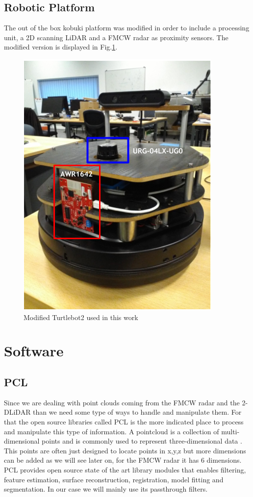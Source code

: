 \subsection{Robotic Platform}
The out of the box kobuki platform was modified in order to include a processing unit, a 2D scanning \ac{LiDAR} and a \ac{FMCW} radar as proximity sensors. The modified version is displayed in Fig.\ref{fig::turlebot2M}. 

\begin{figure}[h] 
\centerline{\includegraphics [width=0.5 \textwidth]{imgs/chapter4/turtlebot2.PNG}}
\caption{Modified Turtlebot2 used in this work}
\label{fig::turlebot2M}
\end{figure}


\section{Software}

\subsection{\ac{PCL}}

Since we are dealing with point clouds coming from the \ac{FMCW} \ac{radar} and the 2-D\ac{LiDAR} than we need some type of ways to handle and manipulate them. For that the open source libraries called \ac{PCL} is the more indicated place to process and manipulate this type of information. A pointcloud is a collection of multi-dimensional points and is commonly used to represent three-dimensional data \cite{pcl}. This points are often just designed to locate points in x,y,z but more dimensions can be added as we will see later on, for the FMCW radar it has 6 dimensions. \ac{PCL} provides open source state of the art library modules that enables  filtering, feature estimation, surface reconstruction, registration, model fitting and segmentation. In our case we will mainly use its passthrough filters. 



